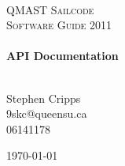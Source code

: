 %
\begin{titlepage}

\begin{center}

{\ }\\[2.2cm]
\textsc{\LARGE QMAST Sailcode}\\[1.5cm]

\textsc{\Large Software Guide 2011}\\[0.5cm]


\HRule \\[0.4cm]
{ \huge \bfseries API Documentation}\\[0.4cm]
\HRule \\[1.5cm]
\end{center}

\begin{raggedright}
\begin{minipage}{0.4\textwidth}
\begin{flushleft} \large
Stephen Cripps \\
			9skc@queensu.ca \\
			06141178
			\end{flushleft}
			\end{minipage}
			\end{raggedright}


				\vfill

				\begin{center}
{\large \today}
\end{center}


\end{titlepage}


